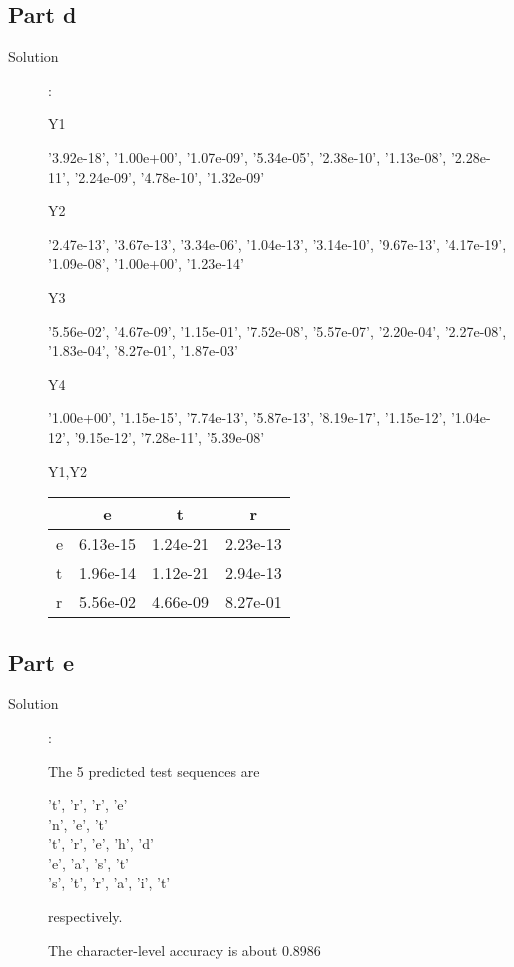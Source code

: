 \documentclass[a4paper,11pt]{article}
\begin{document}
\subsection{Part d}
\begin{description}
  \item [Solution]: 

Y1 \\
 \begin{center}
'3.92e-18', '1.00e+00', '1.07e-09', '5.34e-05', '2.38e-10', '1.13e-08', '2.28e-11', '2.24e-09', '4.78e-10', '1.32e-09'
 \end{center}
Y2 \\
 \begin{center}
'2.47e-13', '3.67e-13', '3.34e-06', '1.04e-13', '3.14e-10', '9.67e-13', '4.17e-19', '1.09e-08', '1.00e+00', '1.23e-14'
 \end{center}
Y3 \\
 \begin{center}
'5.56e-02', '4.67e-09', '1.15e-01', '7.52e-08', '5.57e-07', '2.20e-04', '2.27e-08', '1.83e-04', '8.27e-01', '1.87e-03'
 \end{center}
Y4 \\
 \begin{center}
'1.00e+00', '1.15e-15', '7.74e-13', '5.87e-13', '8.19e-17', '1.15e-12', '1.04e-12', '9.15e-12', '7.28e-11', '5.39e-08'
 \end{center}
Y1,Y2 \\
\begin{center}
\begin{tabular}{l|c|c|c}
	& e & t & r \\ \hline
 e &  6.13e-15 &   1.24e-21 &  2.23e-13 \\
 t &  1.96e-14   &1.12e-21   &2.94e-13 \\
 r &  5.56e-02   &4.66e-09   &8.27e-01 
\end{tabular}
  \end{center}
\end{description}
\subsection{Part e}
\begin{description}
  \item [Solution]: 
  
The 5 predicted test sequences are
\begin{center}
    't', 'r', 'r', 'e' \\
    'n', 'e', 't' \\
    't', 'r', 'e', 'h', 'd' \\
    'e', 'a', 's', 't' \\
    's', 't', 'r', 'a', 'i', 't'
\end{center}
respectively.

The character-level accuracy is about 0.8986
\end{description}
\newpage
\setcounter{section}{3}
\end{document}
